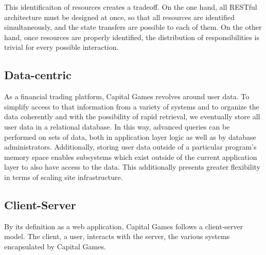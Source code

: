 This identificaiton of resources creates a tradeoff. On
the one hand, all RESTful architecture must be designed
at once, so that all resources are identified simultaneously,
and the state transfers are possible to each of them. On
the other hand, once resources are properly identified, the
distribution of responsibilities is trivial for every possible
interaction.

\subsection{Data-centric}

As a financial trading platform, Capital Games revolves
around user data. To simplify access to that information
from a variety of systems and to organize the data coherently
and with the possibility of rapid retrieval, we eventually store all user data in a relational database. In this way,
advanced queries can be performed on sets of data, both in 
application layer logic as well as by database administrators.
Additionally, storing user data outside of a particular
program's memory space enables subsystems which exist outside
of the current application layer to also have access to the
data. This additionally presents greater flexibility in terms
of scaling site infrastructure.


\subsection{Client-Server}

By its definition as a web application, Capital Games follows a client-server
model. The client, a user, interacts with the server, 
the various systems encapsulated by Capital Games.